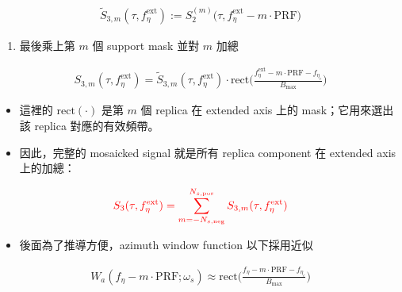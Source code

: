 \documentclass[10pt]{article}
\providecommand{\tightlist}{%
  \setlength{\itemsep}{0pt}\setlength{\parskip}{0pt}}
\begin{document}
\begin{equation}
\begin{aligned}
\widetilde S_{3,m}(\tau,f_\eta^{\mathrm{ext}})
:= S_2^{(m)}\biggl(\tau,f_\eta^{\mathrm{ext}}-m\cdot\mathrm{PRF}\biggr)
\end{aligned}
\end{equation}

\begin{enumerate}
\def\labelenumi{\arabic{enumi})}
\setcounter{enumi}{2}
\tightlist
\item
  最後乘上第 \(m\) 個 support mask 並對 \(m\) 加總
\end{enumerate}

\begin{equation}
\begin{aligned}
S_{3,m}(\tau,f_\eta^{\mathrm{ext}})
= \widetilde S_{3,m}(\tau,f_\eta^{\mathrm{ext}})\cdot
\mathrm{rect}\biggl(\frac{f_\eta^{\mathrm{ext}}-m\cdot\mathrm{PRF}-f_{\eta_c}}{B_{\max}}\biggr)
\end{aligned}
\end{equation}

\begin{itemize}
\item
  這裡的 \(\mathrm{rect}(\cdot)\) 是第 \(m\) 個 replica 在 extended axis
  上的 mask；它用來選出該 replica 對應的有效頻帶。
\item
  因此，完整的 mosaicked signal 就是所有 replica component 在 extended
  axis 上的加總：
\end{itemize}

\begin{equation}
\begin{aligned}
{\color{red}{S_3(\tau,f_\eta^{\mathrm{ext}})=\sum_{m=-N_{s,\mathrm{neg}}}^{N_{s,\mathrm{pos}}}S_{3,m}(\tau,f_\eta^{\mathrm{ext}})}}
\end{aligned}
\end{equation}

\begin{itemize}
\tightlist
\item
  後面為了推導方便，azimuth window function 以下採用近似
\end{itemize}

\begin{equation}
\begin{aligned}
W_a(f_\eta-m\cdot\mathrm{PRF};\omega_s)\approx
\mathrm{rect}\biggl(\frac{f_\eta-m\cdot\mathrm{PRF}-f_{\eta_c}}{B_{\max}}\biggr)
\end{aligned}
\end{equation}
\end{document}
